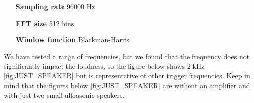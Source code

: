 \documentclass{report}
\theoremstyle{definition}
\theoremstyle{remark}
\begin{document}
    \begin{center}
        \begin{varwidth}{\linewidth}
        \centering
            \begin{itemize}[itemindent=6em]
                \item[\textbf{Sampling rate}] 96000 Hz
                \item[\textbf{FFT size}] 512 bins
                \item[\textbf{Window function}] Blackman-Harris
            \end{itemize}
        \end{varwidth}
    \end{center}


We have tested a range of frequencies, but we found that the frequency does not significantly impact the loudness, so the figure below shows 2 kHz \ref{fig:JUST_SPEAKER} but is representative of other trigger frequencies. Keep in mind that the figures below \ref{fig:JUST_SPEAKER} are without an amplifier and with just two small ultrasonic speakers. 
\end{document}
